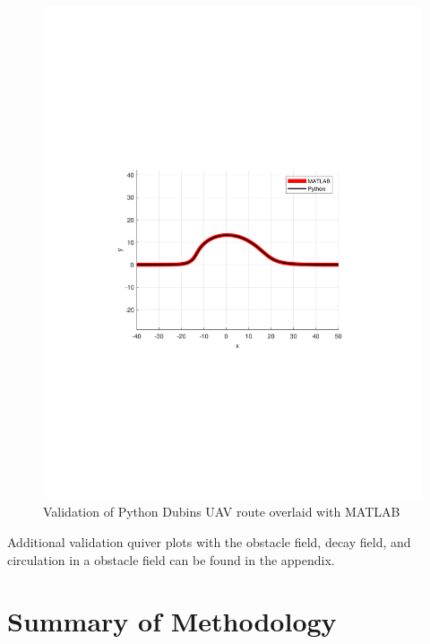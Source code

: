 \documentclass[numbered,pdftex]{ohio-etd}
\begin{document}
\begin{figure}[H]
	\centering
	\includegraphics[trim=0 240 0 260,clip,width=16cm]{PaperFigures/Methods/resultsPython/dubinsPaths}
	\caption{Validation of Python Dubins UAV route overlaid with MATLAB}
	\label{fig:pythonMATDubins}
\end{figure}

Additional validation quiver plots with the obstacle field, decay field, and circulation in a obstacle field can be found in the appendix. 


\section{Summary of Methodology}
\end{document}
